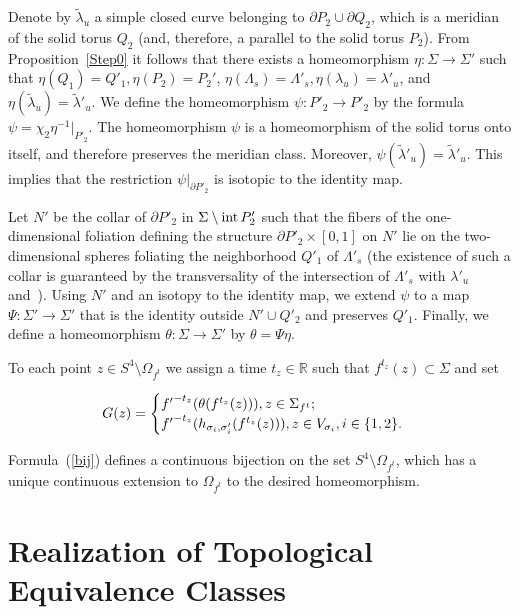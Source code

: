 \documentclass[%
 aip,
 amsmath,amssymb,
preprint,%
]{revtex4-1}
\begin{document}
Denote by $\widetilde \lambda_u$ a simple closed curve belonging to $\partial P_2\cup \partial Q_2$, which is a meridian of the solid torus $Q_2$ (and, therefore, a parallel to the solid torus $P_2$). From Proposition~\ref{Step0} it follows that there exists a homeomorphism $\eta:\Sigma\to \Sigma'$ such that $\eta(Q_1)=Q'_1, \eta(P_2)=P_2'$, $\eta(\Lambda_s)=\Lambda'_s, \eta(\lambda_u)=\lambda'_u$, and $\eta(\widetilde \lambda_u)=\widetilde \lambda'_u$.
We define the homeomorphism $\psi: P'_2\to P'_2$ by the formula $\psi=\chi_2\eta^{-1}|_{P'_2}$. The homeomorphism $\psi$ is a homeomorphism of the solid torus onto itself, and therefore preserves the meridian class. Moreover, $\psi(\widetilde \lambda'_u)=\widetilde \lambda'_u$. This implies that the restriction $\psi|_{\partial P'_2}$ is isotopic to the identity map.

Let $N'$ be the collar of $\partial P'_2$ in $\Sigma\setminus {\rm int}\,P'_2$ such that the fibers of the one-dimensional foliation defining the structure $\partial P'_2\times [0,1]$ on $N'$ lie on the two-dimensional spheres foliating the neighborhood $Q'_1$ of $\Lambda'_s$ (the existence of such a collar is guaranteed by the transversality of the intersection of $\Lambda'_s$ with $\lambda'_u$ and~\cite[Ch.4, Section 6, Exercise~2]{Hi}). Using $N'$ and an isotopy to the identity map, we extend $\psi$ to a map $\Psi:\Sigma'\to \Sigma'$ that is the identity outside $N'\cup Q'_2$ and preserves $Q'_1$. Finally, we define a homeomorphism $\theta: \Sigma\to \Sigma'$ by $\theta=\Psi\eta$.

To each point $z\in S^4\setminus \Omega_{f^t}$ we assign a time $t_z\in \mathbb R$ such that $f^{t_z}(z)\subset \Sigma$ and set

\begin{equation} G(z)=\begin{cases}
{f'}^{-t_z}(\theta(f^{t_z}(z))), z\in \Sigma_{f^t};\cr
{f'}^{-t_z}(h_{\sigma_i,\sigma'_i}(f^{t_z}(z))), z\in V_{\sigma_i}, i\in \{1,2\}.
\end{cases} \label{bij}
\end{equation}

Formula~(\ref{bij}) defines a continuous bijection on the set $S^4\setminus \Omega_{f^t}$, which has a unique continuous extension to $\Omega_{f^t}$ to the desired homeomorphism.

\section{Realization of Topological Equivalence Classes}
\end{document}
